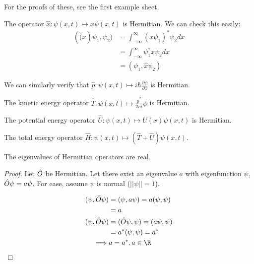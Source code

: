 \documentclass[../Main.tex]{subfiles}
\begin{document}
\begin{examples}{
        For the proofs of these, see the first example sheet.
    }
    \item The operator $\hat{x} : \psi(x, t) \mapsto x\psi(x, t)$ is Hermitian. We can check this easily:
        \begin{align*}
            (\hat(x)\psi_1, \psi_2) &= \int_{-\infty}^\infty (x\psi_1)^* \psi_2 dx \\
            &= \int_{-\infty}^\infty \psi_1^* x \psi_2 dx \\
            &= (\psi_1, \hat{x} \psi_2)
        \end{align*}
    \item We can similarly verify that $\hat{p} : \psi(x, t) \mapsto i\hbar \frac{\partial \psi}{\partial x}$ is Hermitian.
    \item The kinetic energy operator $\hat{T} : \psi(x, t) \mapsto \frac{\hat{p}^2}{2m}\psi$ is Hermitian.
    \item The potential energy operator $\hat{U} : \psi(x, t) \mapsto U(x) \psi(x,t)$ is Hermitian.
    \item The total energy operator $\hat{H} : \psi(x, t) \mapsto (\hat{T} + \hat{U}) \psi(x, t)$.
\end{examples}
\begin{theorem}
    The eigenvalues of Hermitian operators are real.
    \label{thmReaEvals}
\end{theorem}
\begin{proof}
    Let $\hat{O}$ be Hermitian. Let there exist an eigenvalue $a$ with eigenfunction $\psi$, $\hat{O} \psi = a\psi$. For ease, assume $\psi$ is normal ($||\psi|| = 1$).

    \begin{align*}
        (\psi, \op\psi) &= (\psi, a\psi) = a(\psi, \psi) \\
        &= a \\
        (\psi, \op\psi) &= (\op\psi, \psi) = (a\psi, \psi) \\
        &= a^* (\psi, \psi) = a^* \\
        \implies& a = a^*, a \in \R
    \end{align*}
\end{proof}
\end{document}
